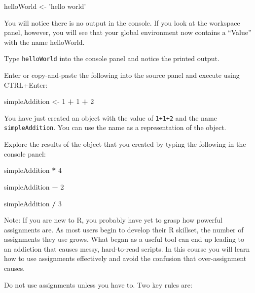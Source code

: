 \documentclass[]{article}
\newenvironment{Shaded}{\begin{snugshade}}{\end{snugshade}}
\newcommand{\DecValTok}[1]{\textcolor[rgb]{0.00,0.00,0.81}{#1}}
\newcommand{\StringTok}[1]{\textcolor[rgb]{0.31,0.60,0.02}{#1}}
\newcommand{\OperatorTok}[1]{\textcolor[rgb]{0.81,0.36,0.00}{\textbf{#1}}}
\newcommand{\NormalTok}[1]{#1}
\begin{document}
\begin{Shaded}
\begin{Highlighting}[]
\NormalTok{helloWorld <-}
\StringTok{  'hello world'}
\end{Highlighting}
\end{Shaded}

You will notice there is no output in the console. If you look at the
workspace panel, however, you will see that your global environment now
contains a ``Value'' with the name helloWorld.

 Type \texttt{helloWorld} into the console panel and notice the printed
output.

 Enter or copy-and-paste the following into the source panel and execute
using CTRL+Enter:

\begin{Shaded}
\begin{Highlighting}[]
\NormalTok{simpleAddition <-}\StringTok{ }
\StringTok{  }\DecValTok{1} \OperatorTok{+}\StringTok{ }\DecValTok{1} \OperatorTok{+}\StringTok{ }\DecValTok{2}
\end{Highlighting}
\end{Shaded}

You have just created an object with the value of \texttt{1+1+2} and the
name \texttt{simpleAddition}. You can use the name as a representation
of the object.

 Explore the results of the object that you created by typing the
following in the console panel:

\begin{Shaded}
\begin{Highlighting}[]
\NormalTok{simpleAddition }\OperatorTok{*}\StringTok{ }\DecValTok{4}

\NormalTok{simpleAddition }\OperatorTok{+}\StringTok{ }\DecValTok{2}

\NormalTok{simpleAddition }\OperatorTok{/}\StringTok{ }\DecValTok{3}
\end{Highlighting}
\end{Shaded}

Note: If you are new to R, you probably have yet to grasp how powerful
assignments are. As most users begin to develop their R skillset, the
number of assignments they use grows. What began as a useful tool can
end up leading to an addiction that causes messy, hard-to-read scripts.
In this course you will learn how to use assignments effectively and
avoid the confusion that over-assignment causes.

 Do not use assignments unless you have to. Two key rules are:
\end{document}

